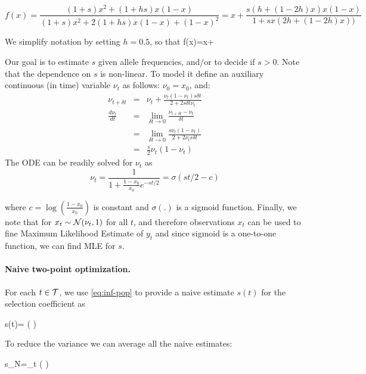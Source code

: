 \begin{equation}
f(x)=\frac{(1+s)x^2 + (1+hs)x(1-x)}{(1+s)x^2 + 2(1+hs)x(1-x) + (1-x)^2}
    =x+\frac{s(h+(1-2h)x)x(1-x)}{1+sx(2h+(1-2h)x))}
\end{equation}

We simplify notation by setting $h=0.5$, so that
\beq
f(x)=x+
\eeq

Our goal is to estimate $s$ given allele frequencies, and/or to decide
if $s>0$. Note that the dependence on $s$ is non-linear. To model it
define an auxiliary continuous (in time) variable $\nu_t$ as follows:
$\nu_0=x_0$, and:
\begin{eqnarray}
  \nu_{t+\delta t} &=& \nu_t+\frac{\nu_t(1-\nu_t)s\delta t}{2+2s\delta t \nu_t}\\
  \frac{d\nu_t}{dt} &=&\lim_{\delta t\rightarrow 0}\frac{\nu_{t+\delta t} -\nu_t}{\delta t}\\
   &=&\lim_{\delta t\rightarrow 0}\frac{s\nu_t(1-\nu_t)}{2+2\nu_ts\delta t}\\
   &=& \frac{s}{2}\nu_t(1-\nu_t) 
  \label{eq:ode}
\end{eqnarray}
The ODE can be readily solved for $\nu_t$ as
\begin{equation}
  \nu_t =\frac{1}{1+\frac{1-x_0}{x_0}e^{-st/2}} = \sigma(st/2-c) 
  \label{eq:inf-pop}
\end{equation}

where $c=\log\left(\frac{1-x_0}{x_0}\right)$ is constant
\cite{multilocus-hitchhike} and $\sigma(.)$ is a sigmoid
function. Finally, we note that for $x_t\sim{\cal N}(\nu_t,1)$ for all $t$,
and therefore observations $x_t$ can be used to fine Maximum
Likelihood Estimate of $y_t$ and since sigmoid is a one-to-one
function, we can find MLE for $s$.

\paragraph{Naive two-point optimization.} 
For each $t\in {\cal T}$, we use \eqref{eq:inf-pop} to provide a naive
estimate $s(t)$ for the selection coefficient as

\beq 
s(t)= \log \left(  \right) 
\eeq

To reduce the variance we can average all the naive estimates: 

\beq
s_{N}=\sum_{t\in \Tc} \log \left(  \right) 
\label{eq:naive}
\eeq


